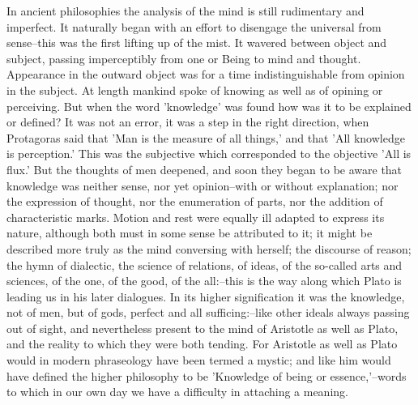 In ancient philosophies the analysis of the mind is still rudimentary
and imperfect. It naturally began with an effort to disengage the
universal from sense--this was the first lifting up of the mist. It
wavered between object and subject, passing imperceptibly from one or
Being to mind and thought. Appearance in the outward object was for a
time indistinguishable from opinion in the subject. At length mankind
spoke of knowing as well as of opining or perceiving. But when the word
'knowledge' was found how was it to be explained or defined? It was not
an error, it was a step in the right direction, when Protagoras said
that 'Man is the measure of all things,' and that 'All knowledge is
perception.' This was the subjective which corresponded to the objective
'All is flux.' But the thoughts of men deepened, and soon they began
to be aware that knowledge was neither sense, nor yet opinion--with or
without explanation; nor the expression of thought, nor the enumeration
of parts, nor the addition of characteristic marks. Motion and rest were
equally ill adapted to express its nature, although both must in some
sense be attributed to it; it might be described more truly as the mind
conversing with herself; the discourse of reason; the hymn of dialectic,
the science of relations, of ideas, of the so-called arts and sciences,
of the one, of the good, of the all:--this is the way along which Plato
is leading us in his later dialogues. In its higher signification it was
the knowledge, not of men, but of gods, perfect and all sufficing:--like
other ideals always passing out of sight, and nevertheless present to
the mind of Aristotle as well as Plato, and the reality to which they
were both tending. For Aristotle as well as Plato would in modern
phraseology have been termed a mystic; and like him would have defined
the higher philosophy to be 'Knowledge of being or essence,'--words to
which in our own day we have a difficulty in attaching a meaning.

